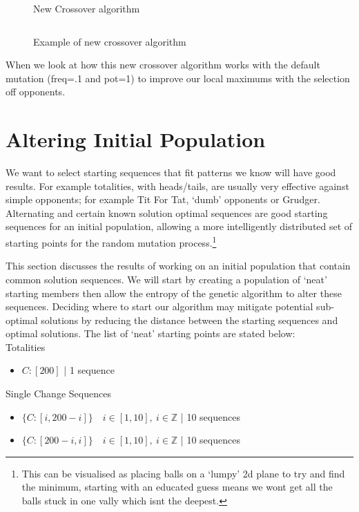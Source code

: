 \begin{figure}
    \inputminted{python}{code_snippets/newCrossover.py}
    \caption{New Crossover algorithm}\label{fig:newCrossover}
\end{figure}

\begin{figure}
    \inputminted{python}{code_snippets/newCrossoverEX.py}
    \caption{Example of new crossover algorithm}\label{fig:newCrossoverEX}
\end{figure}

When we look at how this new crossover algorithm works with the default mutation (freq=.1 and pot=1) to improve our local maximums with the selection off opponents.\\


\section{Altering Initial Population}\label{sec:alteringinitialpopulation}
We want to select starting sequences that fit patterns we know will have good results.
For example totalities, with heads/tails, are usually very effective against simple opponents;
for example Tit For Tat, `dumb' opponents or Grudger.
Alternating and certain known solution optimal sequences are good starting sequences for an initial population, allowing a more intelligently distributed set of starting points for the random mutation process.\footnote{This can be visualised as placing balls on a `lumpy' 2d plane to try and find the minimum, starting with an educated guess means we wont get all the balls stuck in one vally which isnt the deepest.}

This section discusses the results of working on an initial population that contain common solution sequences.
We will start by creating a population of `neat' starting members then allow the entropy of the genetic algorithm to alter these sequences.
Deciding where to start our algorithm may mitigate potential sub-optimal solutions by reducing the distance between the starting sequences and optimal solutions.
The list of `neat' starting points are stated below:\\

Totalities
\begin{itemize}
    \item \(C:[200]\) | 1 sequence
\end{itemize}

Single Change Sequences
\begin{itemize}
    \item \(\{C:[i,200-i]\} \quad i\in [1,10],\ i \in \mathbb{Z}\) | 10 sequences
    \item \(\{C:[200-i,i]\} \quad i\in [1,10],\ i \in \mathbb{Z}\) | 10 sequences
\end{itemize}

